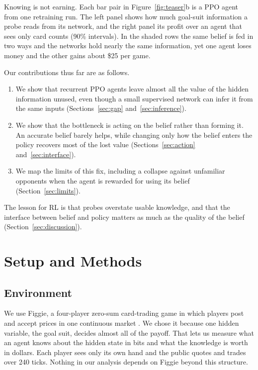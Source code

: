 \documentclass{article}
\begin{document}
Knowing is not earning. Each bar pair in Figure~\ref{fig:teaser}b is a PPO agent from one retraining run. The left panel shows how much goal-suit information a probe reads from its network, and the right panel its profit over an agent that sees only card counts (90\% intervals). In the shaded rows the same belief is fed in two ways and the networks hold nearly the same information, yet one agent loses money and the other gains about \$25 per game.

Our contributions thus far are as follows.
\begin{enumerate}[leftmargin=1.4em,itemsep=1pt,topsep=2pt]
  \item We show that recurrent PPO agents leave almost all the value of the hidden information unused, even though a small supervised network can infer it from the same inputs (Sections~\ref{sec:gap} and~\ref{sec:inference}).
  \item We show that the bottleneck is acting on the belief rather than forming it. An accurate belief barely helps, while changing only how the belief enters the policy recovers most of the lost value (Sections~\ref{sec:action} and~\ref{sec:interface}).
  \item We map the limits of this fix, including a collapse against unfamiliar opponents when the agent is rewarded for using its belief (Section~\ref{sec:limits}).
\end{enumerate}

The lesson for RL is that probes overstate usable knowledge, and that the interface between belief and policy matters as much as the quality of the belief (Section~\ref{sec:discussion}).


\section{Setup and Methods}
\label{sec:setup}

\subsection{Environment}
We use Figgie, a four-player zero-sum card-trading game in which players post and accept prices in one continuous market \cite{disilvio2025figgie,cs224r2025figgie}. We chose it because one hidden variable, the goal suit, decides almost all of the payoff. That lets us measure what an agent knows about the hidden state in bits and what the knowledge is worth in dollars. Each player sees only its own hand and the public quotes and trades over 240 ticks. Nothing in our analysis depends on Figgie beyond this structure.
\end{document}
